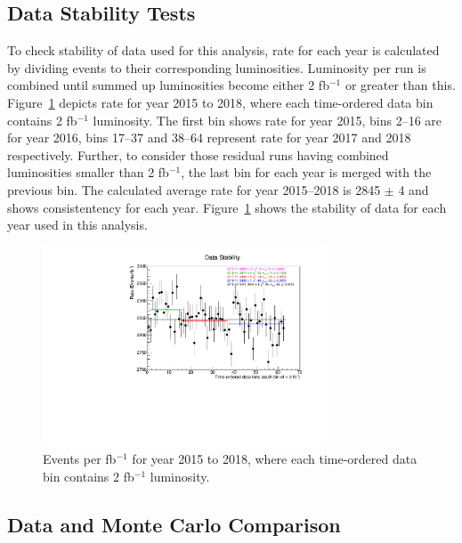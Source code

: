 \subsection{Data Stability Tests}
To check stability of data used for this analysis, rate for each year is calculated by dividing events to their corresponding luminosities. Luminosity per run is combined until summed up luminosities become either 2 fb$^{-1}$ or greater than this. Figure~\ref{fig:DataStability} depicts rate for year 2015 to 2018, where each time-ordered data bin contains 2 fb$^{-1}$ luminosity. The first bin shows rate for year 2015, bins 2--16 are for year 2016, bins 17--37 and 38--64 represent rate for year 2017 and 2018 respectively. Further, to consider those residual runs having combined luminosities smaller than 2 fb$^{-1}$, the last bin for each year is merged with the previous bin. The calculated average rate for year 2015--2018 is 2845 $\pm$ 4 and shows consistentency for each year. Figure~\ref{fig:DataStability} shows the stability of data for each year used in this analysis.
\begin{figure}[h!]
\centering
\includegraphics[width=0.75\textwidth]{figures/DataStability.pdf}
\caption{Events per fb$^{-1}$ for year 2015 to 2018, where each time-ordered data bin contains 2 fb$^{-1}$ luminosity.}
\label{fig:DataStability}
\end{figure}

\subsection{Data and Monte Carlo Comparison}
